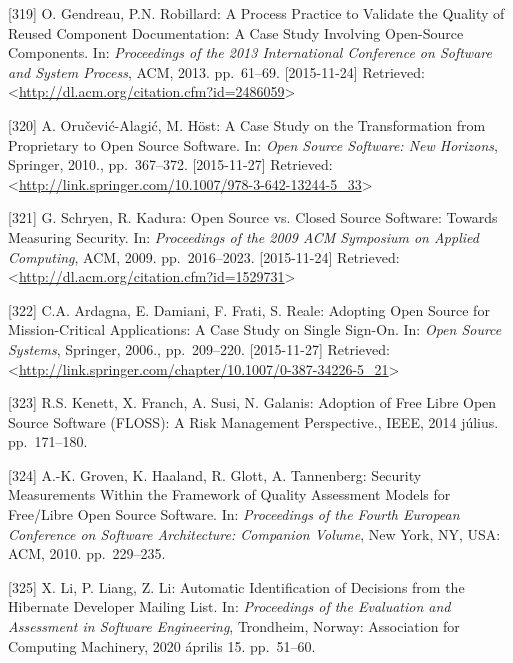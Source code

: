 \documentclass[12pt,magyar,a4paper,oneside]{scrreprt}
\newenvironment{cslreferences}%
  {}%
  {\par}
\begin{document}
\begin{cslreferences}
\leavevmode\hypertarget{ref-gendreau_process_2013}{}%
{[}319{]} O. Gendreau, P.N. Robillard: A Process Practice to Validate
the Quality of Reused Component Documentation: A Case Study Involving
Open-Source Components. In: \emph{Proceedings of the 2013 International
Conference on Software and System Process}, ACM, 2013. pp.~61--69.
{[}2015-11-24{]} Retrieved:
\textless{}\url{http://dl.acm.org/citation.cfm?id=2486059}\textgreater{}

\leavevmode\hypertarget{ref-orucevic-alagic_case_2010}{}%
{[}320{]} A. Oručević-Alagić, M. Höst: A Case Study on the
Transformation from Proprietary to Open Source Software. In: \emph{Open
Source Software: New Horizons}, Springer, 2010., pp.~367--372.
{[}2015-11-27{]} Retrieved:
\textless{}\url{http://link.springer.com/10.1007/978-3-642-13244-5_33}\textgreater{}

\leavevmode\hypertarget{ref-schryen_open_2009}{}%
{[}321{]} G. Schryen, R. Kadura: Open Source vs. Closed Source Software:
Towards Measuring Security. In: \emph{Proceedings of the 2009 ACM
Symposium on Applied Computing}, ACM, 2009. pp.~2016--2023.
{[}2015-11-24{]} Retrieved:
\textless{}\url{http://dl.acm.org/citation.cfm?id=1529731}\textgreater{}

\leavevmode\hypertarget{ref-ardagna_adopting_2006}{}%
{[}322{]} C.A. Ardagna, E. Damiani, F. Frati, S. Reale: Adopting Open
Source for Mission-Critical Applications: A Case Study on Single
Sign-On. In: \emph{Open Source Systems}, Springer, 2006., pp.~209--220.
{[}2015-11-27{]} Retrieved:
\textless{}\url{http://link.springer.com/chapter/10.1007/0-387-34226-5_21}\textgreater{}

\leavevmode\hypertarget{ref-kenett_adoption_2014}{}%
{[}323{]} R.S. Kenett, X. Franch, A. Susi, N. Galanis: Adoption of Free
Libre Open Source Software (FLOSS): A Risk Management Perspective.,
IEEE, 2014 július. pp.~171--180.

\leavevmode\hypertarget{ref-groven_security_2010}{}%
{[}324{]} A.-K. Groven, K. Haaland, R. Glott, A. Tannenberg: Security
Measurements Within the Framework of Quality Assessment Models for
Free/Libre Open Source Software. In: \emph{Proceedings of the Fourth
European Conference on Software Architecture: Companion Volume}, New
York, NY, USA: ACM, 2010. pp.~229--235.

\leavevmode\hypertarget{ref-li_automatic_2020}{}%
{[}325{]} X. Li, P. Liang, Z. Li: Automatic Identification of Decisions
from the Hibernate Developer Mailing List. In: \emph{Proceedings of the
Evaluation and Assessment in Software Engineering}, Trondheim, Norway:
Association for Computing Machinery, 2020 április 15. pp.~51--60.


\end{cslreferences}
\end{document}
